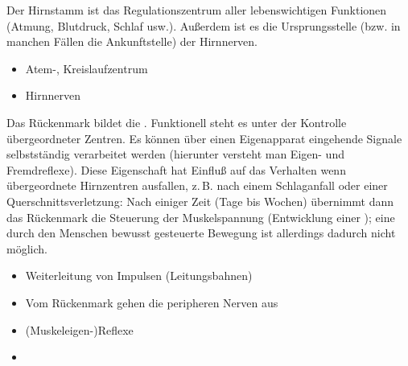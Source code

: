 {%
%
%
Der Hirnstamm ist das Regulationszentrum aller
lebenswichtigen Funktionen (Atmung, Blutdruck, Schlaf usw.).
Außerdem ist es die Ursprungsstelle (bzw. in manchen Fällen
die Ankunftstelle) der Hirnnerven.
}
{
\begin{itemize}
    \item Atem-, Kreislaufzentrum
    \item Hirnnerven
\end{itemize}
}{}{}{}


{%
%
Das Rückenmark bildet die .
Funktionell steht es unter der Kontrolle übergeordneter
Zentren. Es können über einen Eigenapparat eingehende
Signale selbstständig verarbeitet werden (hierunter versteht
man Eigen- und Fremdreflexe). Diese Eigenschaft hat Einfluß
auf das Verhalten wenn übergeordnete Hirnzentren ausfallen,
z.\,B. nach einem Schlaganfall oder einer
Querschnittsverletzung: Nach einiger Zeit (Tage bis Wochen)
übernimmt dann das Rückenmark die Steuerung der
Muskelspannung (Entwicklung einer ); eine durch
den Menschen bewusst gesteuerte Bewegung ist allerdings
dadurch nicht möglich.

 }{
\begin{itemize}
    \item Weiterleitung von Impulsen (Leitungsbahnen)
    \item Vom Rückenmark gehen die peripheren Nerven aus
    \item (Muskeleigen-)Reflexe
    \item {}
\end{itemize}
}{}{}{}

